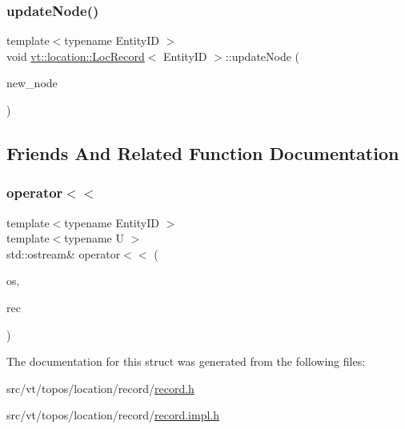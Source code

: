 \mbox{\label{structvt_1_1location_1_1_loc_record_aa66e4f13e89526636b87b3c950bdd91c}} 
\subsubsection{\texorpdfstring{update\+Node()}{updateNode()}}
{\footnotesize\ttfamily template$<$typename Entity\+ID $>$ \\
void \hyperlink{structvt_1_1location_1_1_loc_record}{vt\+::location\+::\+Loc\+Record}$<$ Entity\+ID $>$\+::update\+Node (\begin{DoxyParamCaption}\item[{\hyperlink{namespacevt_a866da9d0efc19c0a1ce79e9e492f47e2}{Node\+Type} const \&}]{new\+\_\+node }\end{DoxyParamCaption})}



\subsection{Friends And Related Function Documentation}
\mbox{\label{structvt_1_1location_1_1_loc_record_ac94f95ab9e7fa58002314e99696972d7}} 
\subsubsection{\texorpdfstring{operator$<$$<$}{operator<<}}
{\footnotesize\ttfamily template$<$typename Entity\+ID $>$ \\
template$<$typename U $>$ \\
std\+::ostream\& operator$<$$<$ (\begin{DoxyParamCaption}\item[{std\+::ostream \&}]{os,  }\item[{\hyperlink{structvt_1_1location_1_1_loc_record}{Loc\+Record}$<$ U $>$ const \&}]{rec }\end{DoxyParamCaption})\hspace{0.3cm}{\ttfamily [friend]}}



The documentation for this struct was generated from the following files\+:\begin{DoxyCompactItemize}
\item 
src/vt/topos/location/record/\hyperlink{record_8h}{record.\+h}\item 
src/vt/topos/location/record/\hyperlink{record_8impl_8h}{record.\+impl.\+h}\end{DoxyCompactItemize}
